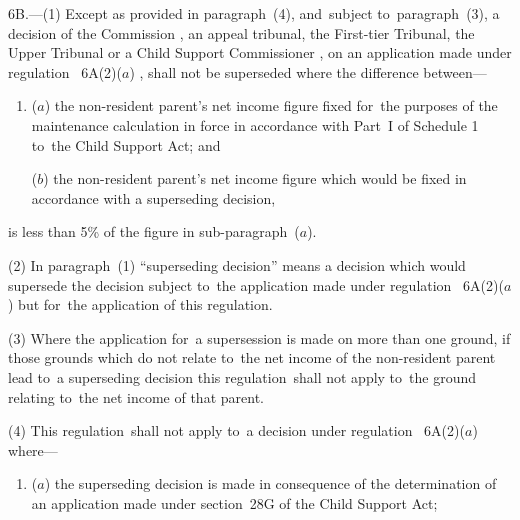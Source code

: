 \documentclass[12pt,a4paper]{article}
\begin{document}
{6B.---(1)  Except as provided in paragraph~(4), and~subject to~paragraph~(3), a decision of the 
Commission%
, 
an appeal tribunal, the First-tier Tribunal, the Upper Tribunal or a Child Support Commissioner%
, on an application made under regulation~%
6A(2)($a$)%
, shall not be superseded where the difference between—
\begin{enumerate}\item[]
($a$) the non-resident parent’s net income figure fixed for~the purposes of the maintenance calculation in force in accordance with Part~I of Schedule 1 to~the Child Support Act; and

($b$) the non-resident parent’s net income figure which would be fixed in accordance with a superseding decision,
\end{enumerate}
is less than 5\% of the figure in sub-paragraph~($a$).

(2) In paragraph~(1) “superseding decision” means a decision which would supersede the decision subject to~the application made under regulation~%
6A(2)($a$)  %
but for~the application of this regulation.


(3) Where the application for~a supersession is made on more than one ground, if those grounds which do not relate to~the net income of the non-resident parent lead to~a superseding decision this regulation~shall not apply to~the ground relating to~the net income of that parent.

(4) This regulation~shall not apply to~a decision under regulation~%
6A(2)($a$)  %
where—
\begin{enumerate}\item[]
($a$) the superseding decision is made in consequence of the determination of an application made under section~28G of the Child Support Act;


\end{enumerate}}
\end{document}
